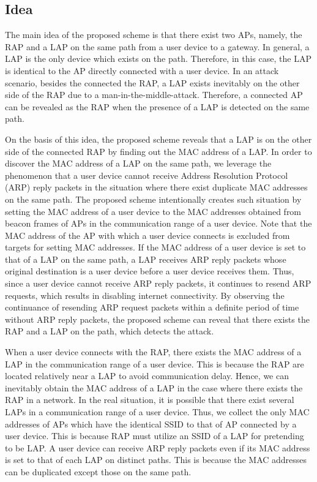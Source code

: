 \documentclass[conference]{IEEEtran}
\begin{document}
\subsection{Idea}
The main idea of the proposed scheme is that there exist two APs, namely, the RAP and a LAP on the same path from a user device to a gateway.
In general, a LAP is the only device which exists on the path.
Therefore, in this case, the LAP is identical to the AP directly connected with a user device.
In an attack scenario, besides the connected the RAP, a LAP exists inevitably on the other side of the RAP due to a man-in-the-middle-attack.
Therefore, a connected AP can be revealed as the RAP when the presence of a LAP is detected on the same path.

On the basis of this idea, the proposed scheme reveals that a LAP is on the other side of the connected RAP by finding out the MAC address of a LAP.
In order to discover the MAC address of a LAP on the same path, we leverage the phenomenon that a user device cannot receive Address Resolution Protocol (ARP) reply packets in the situation where there exist duplicate MAC addresses on the same path.
The proposed scheme intentionally creates such situation by setting the MAC address of a user device to the MAC addresses obtained from beacon frames of APs in the communication range of a user device.
Note that the MAC address of the AP with which a user device connects is excluded from targets for setting MAC addresses.
If the MAC address of a user device is set to that of a LAP on the same path, a LAP receives ARP reply packets whose original destination is a user device before a user device receives them.
Thus, since a user device cannot receive ARP reply packets, it continues to resend ARP requests, which results in disabling internet connectivity.
By observing the continuance of resending ARP request packets within a definite period of time without ARP reply packets, the proposed scheme can reveal that there exists the RAP and a LAP on the path, which detects the attack.

When a user device connects with the RAP, there exists the MAC address of a LAP in the communication range of a user device.
This is because the RAP are located relatively near a LAP to avoid communication delay.
Hence, we can inevitably obtain the MAC address of a LAP in the case where there exists the RAP in a network.
In the real situation, it is possible that there exist several LAPs in a communication range of a user device.
Thus, we collect the only MAC addresses of APs which have the identical SSID to that of AP connected by a user device.
This is because RAP must utilize an SSID of a LAP for pretending to be LAP.
A user device can receive ARP reply packets even if its MAC address is set to that of each LAP on distinct paths.
This is because the MAC addresses can be duplicated except those on the same path.
\end{document}
